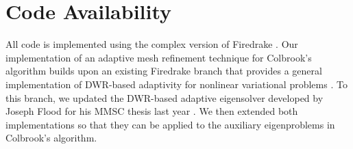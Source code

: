 




\section{Code Availability}



All code is implemented using the complex version of Firedrake \cite{Firedrake}.
Our implementation of an adaptive mesh refinement technique for Colbrook's algorithm builds upon an existing Firedrake branch that provides a general implementation of DWR-based adaptivity for nonlinear variational problems \cite{pablo}. To this branch, we updated the DWR-based adaptive eigensolver developed by Joseph Flood for his MMSC thesis last year \cite{joe}. We then extended both implementations so that they can be applied to the auxiliary eigenproblems in Colbrook's algorithm.

